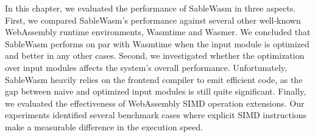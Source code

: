 In this chapter, we evaluated the performance of SableWasm in three aspects. First, we compared SableWasm's performance against several other well-known WebAssembly runtime environments, Wasmtime and Wasmer. We concluded that SableWasm performs on par with Wasmtime when the input module is optimized and better in any other cases. Second, we investigated whether the optimization over input modules affects the system's overall performance. Unfortunately, SableWasm heavily relies on the frontend compiler to emit efficient code, as the gap between naive and optimized input modules is still quite significant. Finally, we evaluated the effectiveness of WebAssembly SIMD operation extensions. Our experiments identified several benchmark cases where explicit SIMD instructions make a measurable difference in the execution speed.